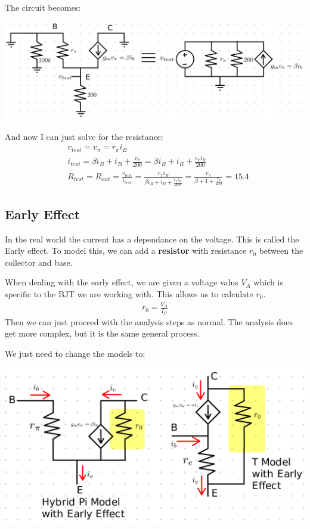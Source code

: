 \documentclass[12pt,letterpaper]{article} \usepackage{amsmath} \usepackage{graphicx} \usepackage[margin=1in]{geometry} \usepackage{longtable}  \usepackage{amssymb}
\begin{document}
\begin{mdframed}
		The circuit becomes:
		\begin{center}
			\includegraphics[width=0.7\linewidth]{bjt-ex3}
		\end{center}
		And now I can just solve for the resistance:
		\begin{align*}
			&v_{test} = v_\pi = r_\pi i_B\\
			&i_{test} = \beta i_B + i_B + \frac{v_\pi}{200} = \beta i_B + i_B + \frac{r_\pi i_B}{200}\\
			&R_{test} = R_{out} = \frac{v_{test}}{i_{test}} = \frac{r_\pi i_B}{\beta i_B + i_B + \frac{r_\pi i_B}{200}} = \frac{r_\pi}{\beta + 1 + \frac{r_\pi }{200}} = 15.4
		\end{align*}
		
	\end{mdframed}
	
	\subsection{Early Effect}
	In the real world the current has a dependance on the voltage. This is called the Early effect. To model this, we can add a \textbf{resistor} with resistance $r_0$ between the collector and base. 
	
	When dealing with the early effect, we are given a voltage valus $V_A$ which is specific to the BJT we are working with. This allows us to calculate $r_0$. 
	\begin{align*}
		r_0 = \frac{V_A}{I_C}
	\end{align*}
	Then we can just proceed with the analysis steps as normal. The analysis does get more complex, but it is the same general process. 
	
	We just need to change the models to:
	\begin{center}
		\includegraphics[width=0.8\linewidth]{hybridpi-tmodel-w-early}
	\end{center}
	
\end{document}
